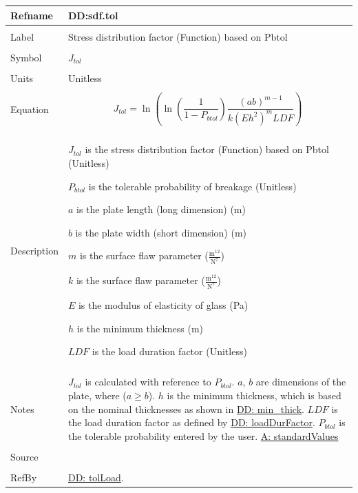\documentclass[12pt]{article}
\begin{document}
\noindent \begin{minipage}{\textwidth}
\begin{tabular}{p{} p{}}
\toprule \textbf{Refname} & \textbf{DD:sdf.tol}
\label{DD:sdf.tol}
\\ \midrule \\
Label & Stress distribution factor (Function) based on Pbtol
\\ \midrule \\
Symbol & ${J_{tol}}$
\\ \midrule \\
Units & Unitless
\\ \midrule \\
Equation & \begin{displaymath}
           {J_{tol}}=\ln\left(\ln\left(\frac{1}{1-{P_{btol}}}\right) \frac{\left(a b\right)^{m-1}}{k \left(E h^{2}\right)^{m} LDF}\right)
           \end{displaymath}
\\ \midrule \\
Description & \begin{symbDescription}
              \item{${J_{tol}}$ is the stress distribution factor (Function) based on Pbtol (Unitless)}
              \item{${P_{btol}}$ is the tolerable probability of breakage (Unitless)}
              \item{$a$ is the plate length (long dimension) (m)}
              \item{$b$ is the plate width (short dimension) (m)}
              \item{$m$ is the surface flaw parameter ($\frac{\text{m}^{12}}{\text{N}^{7}}$)}
              \item{$k$ is the surface flaw parameter ($\frac{\text{m}^{12}}{\text{N}^{7}}$)}
              \item{$E$ is the modulus of elasticity of glass (Pa)}
              \item{$h$ is the minimum thickness (m)}
              \item{$LDF$ is the load duration factor (Unitless)}
              \end{symbDescription}
\\ \midrule \\
Notes & ${J_{tol}}$  is calculated with reference to  ${P_{btol}}$.
        $a$, $b$ are dimensions of the plate, where ($a\geq{}b$).
        $h$ is the minimum thickness, which is based on the nominal thicknesses as shown in \hyperref[DD:min.thick]{DD: min\_thick}.
        $LDF$ is the load duration factor as defined by \hyperref[DD:loadDurFactor]{DD: loadDurFactor}.
        ${P_{btol}}$ is the tolerable probability entered by the user.
        \hyperref[assumpSV]{A: standardValues}
\\ \midrule \\
Source & \cite{astm2009}
\\ \midrule \\
RefBy & \hyperref[DD:tolLoad]{DD: tolLoad}.
\\ \bottomrule \end{tabular}
\end{minipage}
\end{document}
